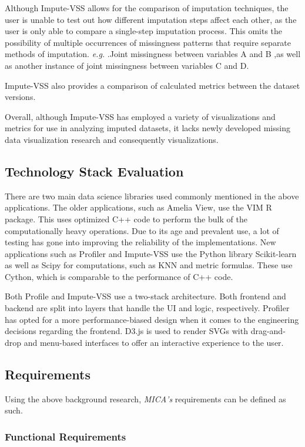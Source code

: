 \documentclass[a4paper, 11pt]{article}
\makeatletter
\newcommand{\eg}{\emph{e.g. }\@ifnextchar.{\!\@gobble}{}}
\newcommand{\micas}{\textit{MICA's }}
\makeatother
\begin{document}
Although Impute-VSS allows for the comparison of imputation techniques, the
user is unable to test out how different imputation steps affect each other, as
the user is only able to compare a single-step imputation process. This omits
the possibility of multiple occurrences of missingness patterns that require
separate methods of imputation. \eg Joint missingness between variables A and B
,as well as another instance of joint missingness between variables C and D.

Impute-VSS also provides a comparison of calculated metrics between the dataset
versions. 

Overall, although Impute-VSS has employed a variety of visualizations and
metrics for use in analyzing imputed datasets, it lacks newly developed
missing data visualization research and consequently visualizations.

\subsection{Technology Stack Evaluation}
There are two main data science libraries used commonly mentioned in the above
applications. The older applications, such as Amelia View, use the VIM R package.
This uses optimized C++ code to perform the bulk of the computationally heavy
operations. Due to its age and prevalent use, a lot of testing has gone into
improving the reliability of the implementations. New applications such as
Profiler and Impute-VSS use the Python library Scikit-learn as well as Scipy for
computations, such as KNN and metric formulas. These use Cython, which is
comparable to the performance of C++ code.

Both Profile and Impute-VSS use a two-stack architecture. Both frontend and
backend are split into layers that handle the UI and logic, respectively.
Profiler has opted for a more performance-biased design when it comes to the
engineering decisions regarding the frontend. D3.js is used to render SVGs
with drag-and-drop and menu-based interfaces to offer an interactive experience
to the user. 

\subsection{Requirements}
Using the above background research, \micas requirements can be defined as
such.

\subsubsection{Functional Requirements}
\end{document}
